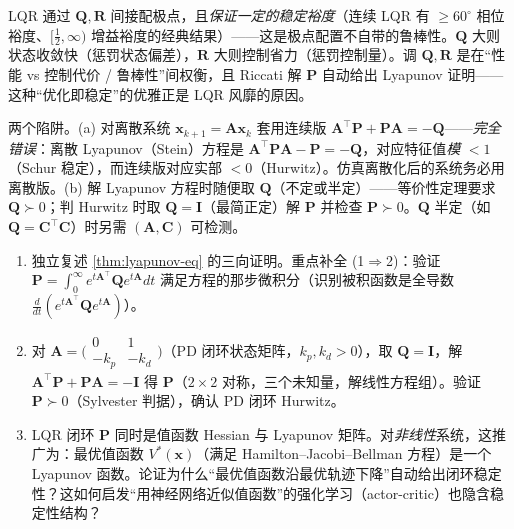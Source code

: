 \begin{insight}
LQR 通过 $\mathbf{Q},\mathbf{R}$ 间接配极点，且\emph{保证一定的稳定裕度}（连续 LQR 有 $\ge60^\circ$ 相位裕度、$[\tfrac12,\infty)$ 增益裕度的经典结果）——这是极点配置不自带的鲁棒性。$\mathbf{Q}$ 大则状态收敛快（惩罚状态偏差），$\mathbf{R}$ 大则控制省力（惩罚控制量）。调 $\mathbf{Q},\mathbf{R}$ 是在“性能 vs 控制代价 / 鲁棒性”间权衡，且 Riccati 解 $\mathbf{P}$ 自动给出 Lyapunov 证明——这种“优化即稳定”的优雅正是 LQR 风靡的原因。
\end{insight}

\begin{pitfall}
两个陷阱。(a) 对离散系统 $\mathbf{x}_{k+1}=\mathbf{A}\mathbf{x}_k$ 套用连续版 $\mathbf{A}^\top\mathbf{P}+\mathbf{P}\mathbf{A}=-\mathbf{Q}$——\emph{完全错误}：离散 Lyapunov（Stein）方程是 $\mathbf{A}^\top\mathbf{P}\mathbf{A}-\mathbf{P}=-\mathbf{Q}$，对应特征值\emph{模} $<1$（Schur 稳定），而连续版对应实部 $<0$（Hurwitz）。仿真离散化后的系统务必用离散版。(b) 解 Lyapunov 方程时随便取 $\mathbf{Q}$（不定或半定）——等价性定理要求 $\mathbf{Q}\succ0$；判 Hurwitz 时取 $\mathbf{Q}=\mathbf{I}$（最简正定）解 $\mathbf{P}$ 并检查 $\mathbf{P}\succ0$。$\mathbf{Q}$ 半定（如 $\mathbf{Q}=\mathbf{C}^\top\mathbf{C}$）时另需 $(\mathbf{A},\mathbf{C})$ 可检测。
\end{pitfall}

\begin{practice}
\begin{enumerate}
  \item 独立复述 \cref{thm:lyapunov-eq} 的三向证明。重点补全 (1$\Rightarrow$2)：验证 $\mathbf{P}=\int_0^\infty e^{t\mathbf{A}^\top}\mathbf{Q}e^{t\mathbf{A}}dt$ 满足方程的那步微积分（识别被积函数是全导数 $\frac{d}{dt}(e^{t\mathbf{A}^\top}\mathbf{Q}e^{t\mathbf{A}})$）。
  \item 对 $\mathbf{A}=\bigl(\begin{smallmatrix}0&1\\-k_p&-k_d\end{smallmatrix}\bigr)$（PD 闭环状态矩阵，$k_p,k_d>0$），取 $\mathbf{Q}=\mathbf{I}$，解 $\mathbf{A}^\top\mathbf{P}+\mathbf{P}\mathbf{A}=-\mathbf{I}$ 得 $\mathbf{P}$（$2\times2$ 对称，三个未知量，解线性方程组）。验证 $\mathbf{P}\succ0$（Sylvester 判据），确认 PD 闭环 Hurwitz。
  \item LQR 闭环 $\mathbf{P}$ 同时是值函数 Hessian 与 Lyapunov 矩阵。对\emph{非线性}系统，这推广为：最优值函数 $V^*(\mathbf{x})$（满足 Hamilton--Jacobi--Bellman 方程）是一个 Lyapunov 函数。论证为什么“最优值函数沿最优轨迹下降”自动给出闭环稳定性？这如何启发“用神经网络近似值函数”的强化学习（actor-critic）也隐含稳定性结构？
\end{enumerate}
\end{practice}

